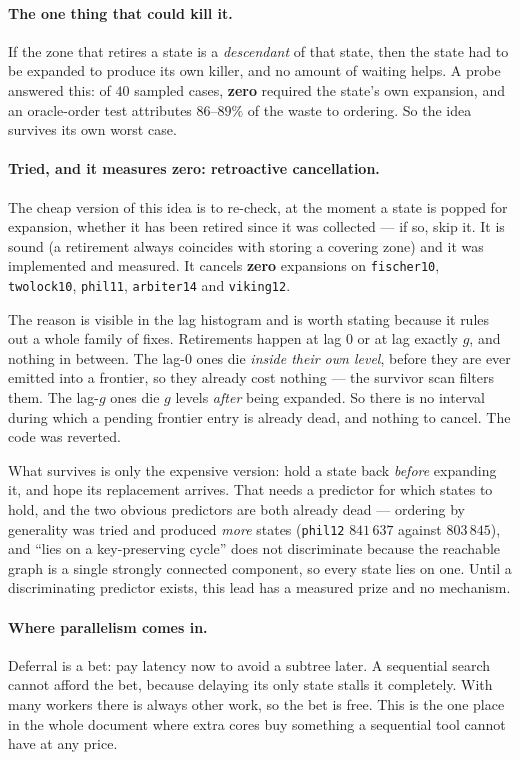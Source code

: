 \paragraph{The one thing that could kill it.} If the zone that retires a state is a
\emph{descendant} of that state, then the state had to be expanded to produce its own killer, and
no amount of waiting helps. A probe answered this: of $40$ sampled cases, \textbf{zero} required
the state's own expansion, and an oracle-order test attributes $86$--$89\%$ of the waste to
ordering. So the idea survives its own worst case.

\paragraph{Tried, and it measures zero: retroactive cancellation.} The cheap version of this idea
is to re-check, at the moment a state is popped for expansion, whether it has been retired since it
was collected --- if so, skip it. It is sound (a retirement always coincides with storing a
covering zone) and it was implemented and measured. It cancels \textbf{zero} expansions on
\texttt{fischer10}, \texttt{twolock10}, \texttt{phil11}, \texttt{arbiter14} and \texttt{viking12}.

The reason is visible in the lag histogram and is worth stating because it rules out a whole family
of fixes. Retirements happen at lag $0$ or at lag exactly $g$, and nothing in between. The lag-$0$
ones die \emph{inside their own level}, before they are ever emitted into a frontier, so they
already cost nothing --- the survivor scan filters them. The lag-$g$ ones die $g$ levels
\emph{after} being expanded. So there is no interval during which a pending frontier entry is
already dead, and nothing to cancel. The code was reverted.

What survives is only the expensive version: hold a state back \emph{before} expanding it, and hope
its replacement arrives. That needs a predictor for which states to hold, and the two obvious
predictors are both already dead --- ordering by generality was tried and produced \emph{more}
states (\texttt{phil12} $841\,637$ against $803\,845$), and ``lies on a key-preserving cycle'' does
not discriminate because the reachable graph is a single strongly connected component, so every
state lies on one. Until a discriminating predictor exists, this lead has a measured prize and no
mechanism.

\paragraph{Where parallelism comes in.} Deferral is a bet: pay latency now to avoid a subtree
later. A sequential search cannot afford the bet, because delaying its only state stalls it
completely. With many workers there is always other work, so the bet is free. This is the one place
in the whole document where extra cores buy something a sequential tool cannot have at any price.
